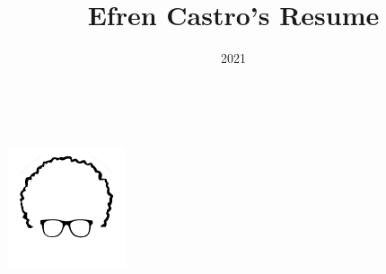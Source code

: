 \documentclass[11pt,oneside,a4paper,titlepage]{article}
\title{Efren Castro's Resume}
\date{2021}
\begin{document}

\begin{tcolorbox}
  \begin{minipage}{15cm}
    \huge{\textcolor{white}{}}\\
    \large{\textcolor{white}{}}
  \end{minipage}
  \begin{minipage}{4.5cm}
    \includegraphics[width=3.5cm,trim=-3cm 5cm 3cm 0]{Logo.png}
  \end{minipage}
\end{tcolorbox}
\end{document}
